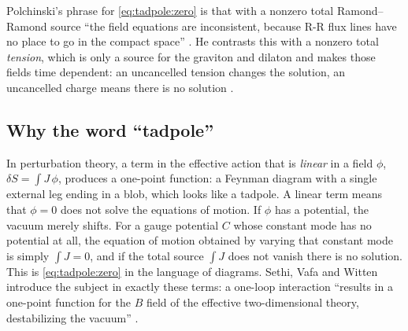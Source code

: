\begin{physicsbox}
Polchinski's phrase for \eqref{eq:tadpole:zero} is that with a nonzero total
Ramond--Ramond source ``the field equations are inconsistent, because R-R flux lines have no
place to go in the compact space'' . He contrasts this with a
nonzero total \emph{tension}, which is only a source for the graviton and dilaton and makes
those fields time dependent: an uncancelled tension changes the solution, an uncancelled
charge means there is no solution .
\end{physicsbox}

\subsection{Why the word ``tadpole''}
In perturbation theory, a term in the effective action that is \emph{linear} in a field
$\phi$, $\delta S=\int J\,\phi$, produces a one-point function: a Feynman diagram with a
single external leg ending in a blob, which looks like a tadpole. A linear term means that
$\phi=0$ does not solve the equations of motion. If $\phi$ has a potential, the vacuum
merely shifts. For a gauge potential $C$ whose constant mode
has no potential at all, the equation of motion obtained by varying that constant mode is
simply $\int J=0$, and if the total source $\int J$ does not vanish there is no solution.
This is \eqref{eq:tadpole:zero} in the language of diagrams.
Sethi, Vafa and Witten introduce the subject in exactly these terms: a one-loop interaction
``results in a one-point function for the $B$ field of the effective two-dimensional theory,
destabilizing the vacuum'' .

